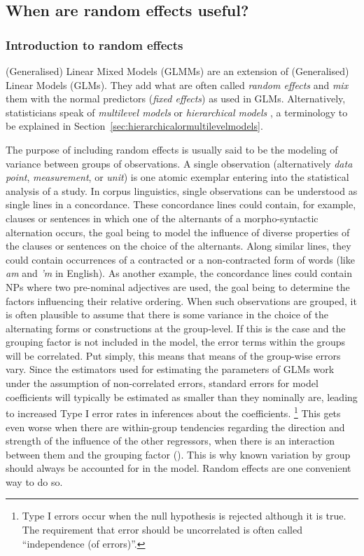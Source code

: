 \subsection{When are random effects useful?}
\label{sec:whenrandomeffectsareuseful}

\subsubsection{Introduction to random effects}
\label{sec:introductiontorandomeffects}

(Generalised) Linear Mixed Models (GLMMs) are an extension of (Generalised) Linear Models (GLMs).
They add what are often called \textit{random effects} and \textit{mix} them with the normal predictors (\textit{fixed effects}) as used in GLMs.
Alternatively, statisticians speak of \textit{multilevel models} or \textit{hierarchical models} \citep{GelmanHill2006}, a terminology to be explained in Section~\ref{sec:hierarchicalormultilevelmodels}.

The purpose of including random effects is usually said to be the modeling of variance between groups of observations.
A single observation (alternatively \textit{data point}, \textit{measurement}, or \textit{unit}) is one atomic exemplar entering into the statistical analysis of a study.
In corpus linguistics, single observations can be understood as single lines in a concordance.
These concordance lines could contain, for example, clauses or sentences in which one of the alternants of a morpho-syntactic alternation occurs, the goal being to model the influence of diverse properties of the clauses or sentences on the choice of the alternants.
Along similar lines, they could contain occurrences of a contracted or a non-contracted form of words (like \textit{am} and \textit{'m} in English).
As another example, the concordance lines could contain NPs where two pre-nominal adjectives are used, the goal being to determine the factors influencing their relative ordering.
When such observations are grouped, it is often plausible to assume that there is some variance in the choice of the alternating forms or constructions at the group-level.
If this is the case and the grouping factor is not included in the model, the error terms within the groups will be correlated.
Put simply, this means that means of the group-wise errors vary.
Since the estimators used for estimating the parameters of GLMs work under the assumption of non-correlated errors, standard errors for model coefficients will typically be estimated as smaller than they nominally are, leading to increased Type I error rates in inferences about the coefficients.%
\footnote{Type I errors occur when the null hypothesis is rejected although it is true.
The requirement that error should be uncorrelated is often called ``independence (of errors)''.}
This gets even worse when there are within-group tendencies regarding the direction and strength of the influence of the other regressors, \ie when there is an interaction between them and the grouping factor (\eg \citealt{SchielzethForstmeier2009}).
This is why known variation by group should always be accounted for in the model.
Random effects are one convenient way to do so.

